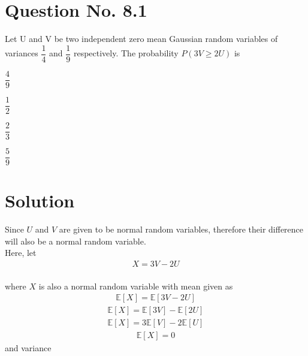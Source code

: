 \documentclass[journal,12pt,twocolumn]{IEEEtran}
\begin{document}
\section{Question No. 8.1} 
\item Let U and V be two independent zero mean Gaussian random variables of variances $\dfrac{1}{4}$ and $\dfrac{1}{9}$ respectively. The probability $P(3V\geqslant2U)$ is
\begin{enumerate}
\begin{multicols}{4}
\setlength\itemsep{2em}
\item $
\dfrac{4}{9}
$
\item $
\dfrac{1}{2}
$
\item $
\dfrac{2}{3}
$
\item $
\dfrac{5}{9}
$
\end{multicols}
\section{Solution}

Since $U$ and $V$ are given to be normal random variables, therefore their difference will also be a normal random variable.\\

Here, let 
\begin{align}
   X=3V-2U 
\end{align}
 \\where $X$ is also a normal random variable with mean given as
 \begin{align}
  \mathbb{E}[X]=\mathbb{E}[3V-2U]
 \end{align}
 \begin{align}
     \mathbb{E}[X]=\mathbb{E}[3V]-\mathbb{E}[2U]
 \end{align}
 \begin{align}
     \mathbb{E}[X]=3\mathbb{E}[V]-2\mathbb{E}[U]
 \end{align}
 \begin{align}
     \mathbb{E}[X]=0
 \end{align}
 and variance
 \begin{column}
 


\end{column}
\end{enumerate}
\end{document}
